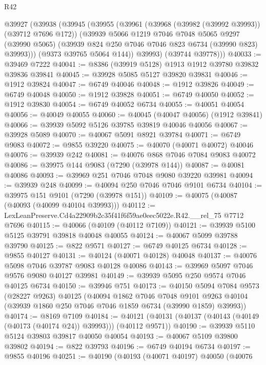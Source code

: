 \begin{lexlean}{R42}
\begin{coremodule}
{    @39927
      (@39938
        (@39945
          (@39955
            (@39961
              (@39968 (@39982 (@39992 @39993)) (@39712 @7696 @172))
              (@39939
                @5066
                @1219
                @7046
                @7048
                @5065
                @9297
                (@39990 @5065)
                (@39939 @824 @250 @7046 @7046 @823 @6734 (@39990 @823) @39993)))
            (@9373 @39765 @5064 @144))
          @39993)
        (@39744 @39778)))
@40033 := @39469 @7222
@40041 := @8386 (@39919 @5128) @1913 @1912 @39780 @39832 @39836 @39841
@40045 := @39928 @5085 @5127 @39820 @39831
@40046 := @1912 @39824
@40047 := @6749 @40046
@40048 := @1912 @39826
@40049 := @6749 @40048
@40050 := @1912 @39828
@40051 := @6749 @40050
@40052 := @1912 @39830
@40054 := @6749 @40052 @6734
@40055 := @40051 @40054
@40056 := @40049 @40055
@40060 := @40045 (@40047 @40056) (@1912 @39841)
@40066 := @39939 @5092 @5126 @39785 @39819 @40046 @40056
@40067 := @39928 @5089
@40070 := @40067 @5091 @8921 @39784
@40071 := @6749 @9083
@40072 := @9855 @39220
@40075 := @40070 (@40071 @40072) @40046
@40076 := @39939 @242
@40081 := @40076 @868 @7046 @7084 @9083 @40072
@40086 := @39975 @144 @9083 (@7290 (@39978 @144))
@40087 := @40081 @40086
@40093 := @39969 @251 @7046 @7048 @9080 @39220 @39981
@40094 := @39939 @248
@40099 := @40094 @250 @7046 @7046 @9101 @6734
@40104 := @39975 @151 @9101 (@7290 (@39978 @151))
@40109 := @40075 (@40087 (@40093 (@40099 @40104 @39993)))
@40112 := LexLeanPreserve.Cd4a22909b2c35f41f6f59ae0eec5022e.R42.__rel_75 @7712 @7696
@40115 := @40066 (@40109 (@40112 @7109))
@40121 := @39939 @5100 @5125 @39791 @39818 @40048 @40055
@40124 := @40067 @5099 @39788 @39790
@40125 := @822 @9571
@40127 := @6749 @40125 @6734
@40128 := @9855 @40127
@40131 := @40124 (@40071 @40128) @40048
@40137 := @40076 @5098 @7046 @39787 @9083 @40128 @40086
@40143 := @39969 @5097 @7046 @9576 @9080 @40127 @39981
@40149 := @39939 @5095 @250 @9574 @7046 @40125 @6734
@40150 := @39946 @751
@40173 := @40150
    @5094
    @7084
    @9573
    (@28227 @9263)
    @40125
    (@40094
      @1862
      @7046
      @7048
      @9101
      @9263
      @40104
      (@39939 @1860 @250 @7046 @7046 @1859 @6734 (@39990 @1859) @39993))
@40174 := @8169 @7109
@40184 := @40121 (@40131 (@40137 (@40143 (@40149 (@40173 (@40174 @24)) @39993))) (@40112 @9571))
@40190 := @39939 @5110 @5124 @39803 @39817 @40050 @40054
@40193 := @40067 @5109 @39800 @39802
@40194 := @822 @39793
@40196 := @6749 @40194 @6734
@40197 := @9855 @40196
@40251 := @40190
    (@40193
      (@40071 @40197)
      @40050
      (@40076
}
\end{coremodule}
\end{lexlean}
